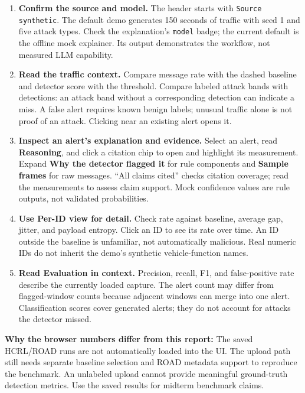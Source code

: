 \documentclass[10pt,letterpaper]{article}
\begin{document}
\begin{enumerate}
\item \textbf{Confirm the source and model.} The header starts with \texttt{Source synthetic}. The default demo generates 150 seconds of traffic with seed 1 and five attack types. Check the explanation's \texttt{model} badge; the current default is the offline mock explainer. Its output demonstrates the workflow, not measured LLM capability.
\item \textbf{Read the traffic context.} Compare message rate with the dashed baseline and detector score with the threshold. Compare labeled attack bands with detections: an attack band without a corresponding detection can indicate a miss. A false alert requires known benign labels; unusual traffic alone is not proof of an attack. Clicking near an existing alert opens it.
\item \textbf{Inspect an alert's explanation and evidence.} Select an alert, read \textbf{Reasoning}, and click a citation chip to open and highlight its measurement. Expand \textbf{Why the detector flagged it} for rule components and \textbf{Sample frames} for raw messages. ``All claims cited'' checks citation coverage; read the measurements to assess claim support. Mock confidence values are rule outputs, not validated probabilities.
\item \textbf{Use Per-ID view for detail.} Check rate against baseline, average gap, jitter, and payload entropy. Click an ID to see its rate over time. An ID outside the baseline is unfamiliar, not automatically malicious. Real numeric IDs do not inherit the demo's synthetic vehicle-function names.
\item \textbf{Read Evaluation in context.} Precision, recall, F1, and false-positive rate describe the currently loaded capture. The alert count may differ from flagged-window counts because adjacent windows can merge into one alert. Classification scores cover generated alerts; they do not account for attacks the detector missed.
\end{enumerate}

\textbf{Why the browser numbers differ from this report:} The saved HCRL/ROAD runs are not automatically loaded into the UI. The upload path still needs separate baseline selection and ROAD metadata support to reproduce the benchmark. An unlabeled upload cannot provide meaningful ground-truth detection metrics. Use the saved results for midterm benchmark claims.
\end{document}
